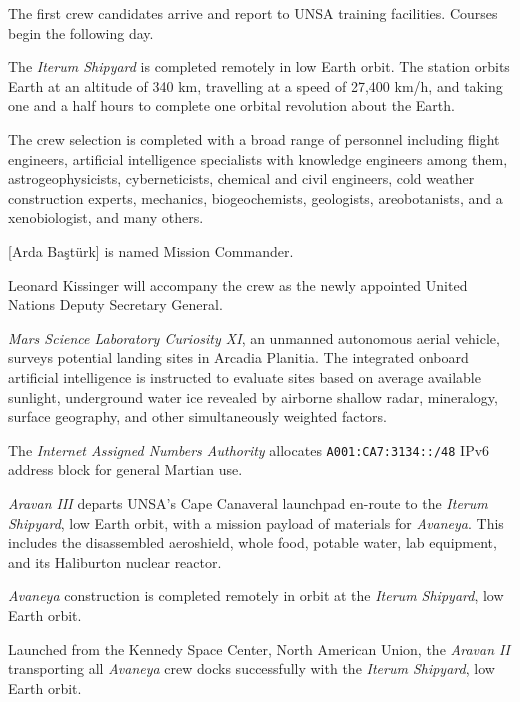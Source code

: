 The first crew candidates arrive and report to UNSA training facilities. Courses begin the following day.
\StopTimelineDate

The {\it Iterum Shipyard} is completed remotely in low Earth orbit. The station orbits Earth at an altitude of 340 km, travelling at a speed of 27,400 km/h, and taking one and a half hours to complete one orbital revolution about the Earth.
\StopTimelineDate

The crew selection is completed with a broad range of personnel including flight engineers, artificial intelligence specialists with knowledge engineers among them, astrogeophysicists, cyberneticists, chemical and civil engineers, cold weather construction experts, mechanics, biogeochemists, geologists, areobotanists, and a xenobiologist, and many others. 

[Arda Baştürk] is named Mission Commander. 

Leonard Kissinger will accompany the crew as the newly appointed United Nations Deputy Secretary General.
\StopTimelineDate

{\it Mars Science Laboratory Curiosity XI}, an unmanned autonomous aerial vehicle, surveys potential landing sites in Arcadia Planitia. The integrated onboard artificial intelligence is instructed to evaluate sites based on average available sunlight, underground water ice revealed by airborne shallow radar, mineralogy, surface geography, and other simultaneously weighted factors.
\StopTimelineDate

The {\it Internet Assigned Numbers Authority} allocates {\tt A001:CA7:3134::/48} IPv6 address block for general Martian use. 
\StopTimelineDate

{\it Aravan III} departs UNSA's Cape Canaveral launchpad en-route to the {\it Iterum Shipyard}, low Earth orbit, with a mission payload of materials for {\it Avaneya}. This includes the disassembled aeroshield, whole food, potable water, lab equipment, and its Haliburton nuclear reactor.
\StopTimelineDate

{\it Avaneya} construction is completed remotely in orbit at the {\it Iterum Shipyard}, low Earth orbit.
\StopTimelineDate

Launched from the Kennedy Space Center, North American Union, the {\it Aravan II} transporting all {\it Avaneya} crew docks successfully with the {\it Iterum Shipyard}, low Earth orbit.
\StopTimelineDate


